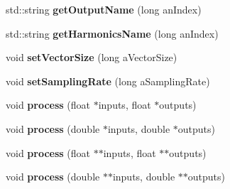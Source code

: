 \begin{DoxyCompactItemize}
\item 
\hypertarget{class_ambisonic_a45d8dc7cb9332f3d2bc1aff307580e32}{std\-::string {\bfseries get\-Output\-Name} (long an\-Index)}\label{class_ambisonic_a45d8dc7cb9332f3d2bc1aff307580e32}

\item 
\hypertarget{class_ambisonic_a7384a42564963ec832f2ad95c456b9f6}{std\-::string {\bfseries get\-Harmonics\-Name} (long an\-Index)}\label{class_ambisonic_a7384a42564963ec832f2ad95c456b9f6}

\item 
\hypertarget{class_ambisonic_ac2ca7f258a53954432591c2e2ef6cf01}{void {\bfseries set\-Vector\-Size} (long a\-Vector\-Size)}\label{class_ambisonic_ac2ca7f258a53954432591c2e2ef6cf01}

\item 
\hypertarget{class_ambisonic_a29b3a285174a2134c097a1a7aac0bc5c}{void {\bfseries set\-Sampling\-Rate} (long a\-Sampling\-Rate)}\label{class_ambisonic_a29b3a285174a2134c097a1a7aac0bc5c}

\item 
\hypertarget{class_ambisonic_a73a15de8bf82502dc69fa792c2f7c473}{void {\bfseries process} (float $\ast$inputs, float $\ast$outputs)}\label{class_ambisonic_a73a15de8bf82502dc69fa792c2f7c473}

\item 
\hypertarget{class_ambisonic_aa22119ffe9f4077e5b08a6439f9c148d}{void {\bfseries process} (double $\ast$inputs, double $\ast$outputs)}\label{class_ambisonic_aa22119ffe9f4077e5b08a6439f9c148d}

\item 
\hypertarget{class_ambisonic_ada04f55e2d9dd23389b3a4fa94ff055d}{void {\bfseries process} (float $\ast$$\ast$inputs, float $\ast$$\ast$outputs)}\label{class_ambisonic_ada04f55e2d9dd23389b3a4fa94ff055d}

\item 
\hypertarget{class_ambisonic_a015cc897c79c324bfae4bf08cd05bc9a}{void {\bfseries process} (double $\ast$$\ast$inputs, double $\ast$$\ast$outputs)}\label{class_ambisonic_a015cc897c79c324bfae4bf08cd05bc9a}

\end{DoxyCompactItemize}

